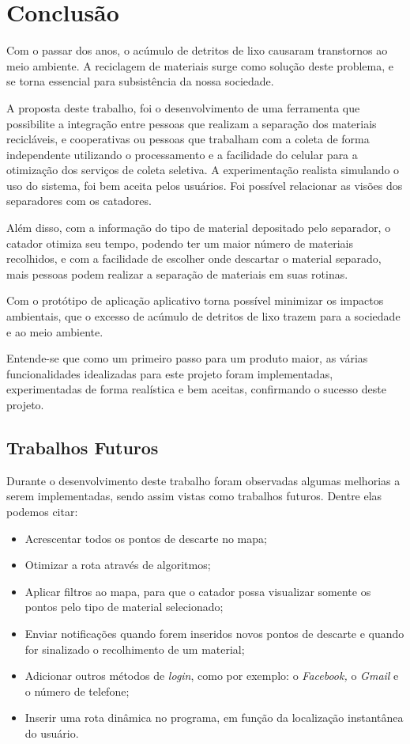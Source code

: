 \chapter{Conclusão}
\label{cap:conclusão}
Com o passar dos anos, o acúmulo de detritos de lixo causaram transtornos ao meio ambiente. A reciclagem de materiais surge como solução deste problema, e se torna essencial para subsistência da nossa sociedade.

A proposta deste trabalho, foi o desenvolvimento de uma ferramenta que possibilite a integração entre pessoas que realizam a separação dos materiais recicláveis, e cooperativas ou pessoas que trabalham com a coleta de forma independente utilizando o processamento e a facilidade do celular para a otimização dos serviços de coleta seletiva. A experimentação realista simulando o uso do sistema, foi bem aceita pelos usuários. Foi possível relacionar as visões dos separadores com os catadores.

Além disso, com a informação do tipo de material depositado pelo separador, o catador otimiza seu tempo, podendo ter um maior número de materiais recolhidos, e com a facilidade de escolher onde descartar o material separado, mais pessoas podem realizar a separação de materiais em suas rotinas. 

Com o protótipo de aplicação aplicativo torna possível minimizar os impactos ambientais, que o excesso de acúmulo de detritos de lixo trazem para a sociedade e ao meio ambiente.

Entende-se que como um primeiro passo para um produto maior, as várias funcionalidades idealizadas para este projeto foram implementadas, experimentadas de forma realística e bem aceitas, confirmando o sucesso deste projeto.

\section{Trabalhos Futuros}

Durante o desenvolvimento deste trabalho foram observadas algumas melhorias a serem implementadas, sendo assim vistas como trabalhos futuros. Dentre elas podemos citar:

\begin{itemize}
	\item Acrescentar todos os pontos de descarte no mapa;
	\item Otimizar a rota através de algoritmos;
	\item Aplicar filtros ao mapa, para que o catador possa visualizar somente os pontos pelo tipo de material selecionado;
	\item Enviar notificações quando forem inseridos novos pontos de descarte e quando for sinalizado o recolhimento de um material;
\setlength{\parskip}{9.96pt}
	\item Adicionar outros métodos de \textit{login}, como por exemplo: o \textit{Facebook, }o \textit{Gmail }e o número de telefone;
	\item Inserir uma rota dinâmica no programa, em função da localização instantânea do usuário.
\end{itemize}

 \glsaddall